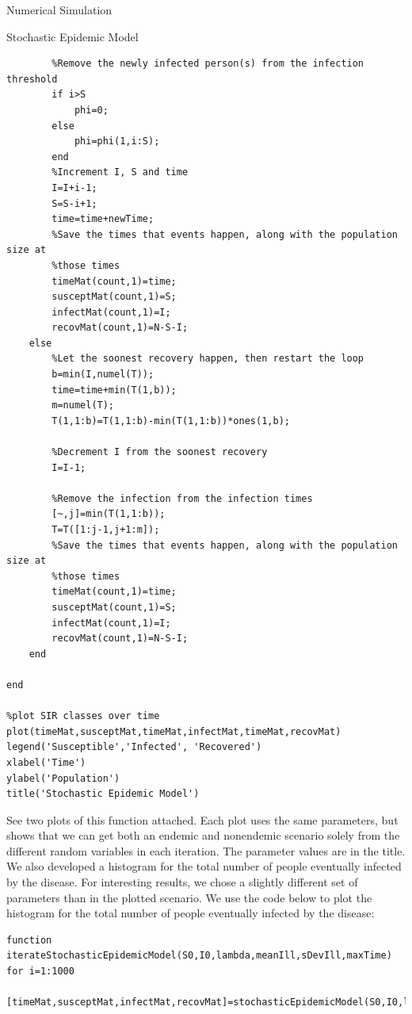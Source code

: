 \documentclass[12pt]{article}
\numberwithin{equation}{section}
\begin{document}
\begin{section}{Numerical Simulation}
\begin{subsection}{Stochastic Epidemic Model}
\begin{lstlisting}
        %Remove the newly infected person(s) from the infection threshold
        if i>S
            phi=0;
        else
            phi=phi(1,i:S);
        end
        %Increment I, S and time
        I=I+i-1;
        S=S-i+1;
        time=time+newTime;
        %Save the times that events happen, along with the population size at
        %those times
        timeMat(count,1)=time;
        susceptMat(count,1)=S;
        infectMat(count,1)=I;
        recovMat(count,1)=N-S-I;
    else
        %Let the soonest recovery happen, then restart the loop
        b=min(I,numel(T));
        time=time+min(T(1,b));
        m=numel(T);
        T(1,1:b)=T(1,1:b)-min(T(1,1:b))*ones(1,b);

        %Decrement I from the soonest recovery
        I=I-1;

        %Remove the infection from the infection times
        [~,j]=min(T(1,1:b));
        T=T([1:j-1,j+1:m]);
        %Save the times that events happen, along with the population size at
        %those times
        timeMat(count,1)=time;
        susceptMat(count,1)=S;
        infectMat(count,1)=I;
        recovMat(count,1)=N-S-I;
    end

end

%plot SIR classes over time
plot(timeMat,susceptMat,timeMat,infectMat,timeMat,recovMat)
legend('Susceptible','Infected', 'Recovered')
xlabel('Time')
ylabel('Population')
title('Stochastic Epidemic Model')

\end{lstlisting}
See two plots of this function attached. Each plot uses the same parameters, but shows that we can get both an endemic and nonendemic scenario solely from the different random variables in each iteration. The parameter values are in the title.\\
We also developed a histogram for the total number of people eventually infected by the disease. For interesting results, we chose a slightly different set of parameters than in the plotted scenario. We use the code below to plot the histogram for the total number of people eventually infected by the disease: 
\begin{lstlisting}
function iterateStochasticEpidemicModel(S0,I0,lambda,meanIll,sDevIll,maxTime)
for i=1:1000
    [timeMat,susceptMat,infectMat,recovMat]=stochasticEpidemicModel(S0,I0,lambda,meanIll,sDevIll,maxTime);


\end{lstlisting}
\end{subsection}
\end{section}
\end{document}
